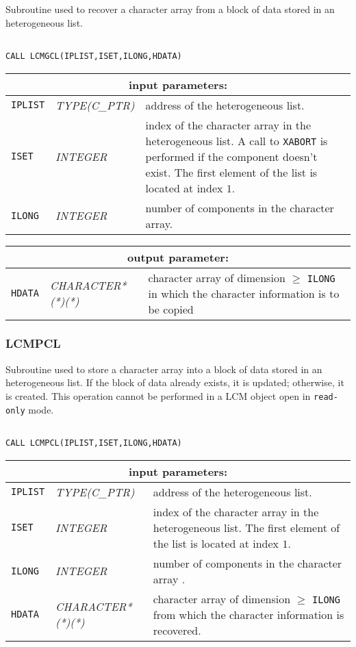 Subroutine used to recover a character array from a block of data stored in an heterogeneous list.

\begin{verbatim}

CALL LCMGCL(IPLIST,ISET,ILONG,HDATA)
\end{verbatim}

\noindent
\begin{tabular}{|p{1.5cm}|p{3cm}|p{10cm}|}
\hline
\multicolumn{3}{|c|}{\bf input parameters:} \\
\hline
{\tt IPLIST} & {\it TYPE(C\_PTR)} & address of the heterogeneous list. \\
\hline
{\tt ISET} & {\it INTEGER} &  index of the character array in the heterogeneous list. A call to {\tt XABORT} is performed if the component doesn't exist.
The first element of the list is located at index $1$.\\
\hline
{\tt ILONG} & {\it INTEGER} & number of components in the character array.\\
\hline
\end{tabular}

\vskip 0.8cm

\noindent
\begin{tabular}{|p{1.5cm}|p{3.5cm}|p{9.5cm}|}
\hline
\multicolumn{3}{|c|}{\bf output parameter:} \\
\hline
{\tt HDATA} & {\it CHARACTER*(*)(*)} & character array of dimension $\ge$ {\tt ILONG} in which the character information is to be copied \\
\hline
\end{tabular}

\subsubsection{LCMPCL}\label{sect:LCMPCL}

Subroutine used to store a character array into a block of data stored in an heterogeneous list.
If the block of data already exists, it is updated; otherwise, it is created. This operation cannot be performed
in a LCM object open in {\tt read-only} mode.

\begin{verbatim}

CALL LCMPCL(IPLIST,ISET,ILONG,HDATA)
\end{verbatim}

\noindent
\begin{tabular}{|p{1.5cm}|p{3.5cm}|p{9.5cm}|}
\hline
\multicolumn{3}{|c|}{\bf input parameters:} \\
\hline
{\tt IPLIST} & {\it TYPE(C\_PTR)} & address of the heterogeneous list. \\
\hline
{\tt ISET} & {\it INTEGER} & index of the character array in the heterogeneous list.
The first element of the list is located at index  $1$. \\
\hline
{\tt ILONG} & {\it INTEGER} & number of components in the character array .\\
\hline
{\tt HDATA} & {\it CHARACTER*(*)(*)} & character array of dimension $\ge$ {\tt ILONG} from which the character information is recovered.  \\
\hline
\end{tabular}

